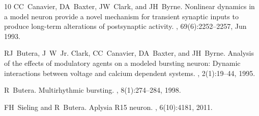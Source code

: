 \documentclass[nofootinbib,aip,amsmath,amssymb,preprint,twocolumn,floatfix,10pt]{revtex4-2}
\begin{document}
\begin{thebibliography}{10}
CC~Canavier, DA~Baxter, JW~Clark, and JH~Byrne.
\newblock Nonlinear dynamics in a model neuron provide a novel mechanism for
  transient synaptic inputs to produce long-term alterations of postsynaptic
  activity.
, 69(6):2252--2257, Jun 1993.

RJ~Butera, J~W~Jr. Clark, CC~Canavier, DA~Baxter, and JH~Byrne.
\newblock Analysis of the effects of modulatory agents on a modeled bursting
  neuron: Dynamic interactions between voltage and calcium dependent systems.
, 2(1):19--44, 1995.

R~Butera.
\newblock Multirhythmic bursting.
, 8(1):274--284, 1998.

FH~Sieling and R~Butera.
\newblock Aplysia {R}15 neuron.
, 6(10):4181, 2011.

\end{thebibliography}
\end{document}
